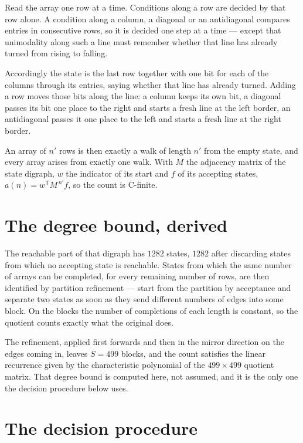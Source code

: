 \documentclass[11pt]{article}
\theoremstyle{definition}
\begin{document}
Read the array one row at a time. Conditions along a row are decided by that row alone. A condition along a column, a diagonal or an antidiagonal compares entries in consecutive rows, so it is decided one step at a time --- except that unimodality along such a line must remember whether that line has already turned from rising to falling.

Accordingly the state is the last row together with one bit for each of the columns through its entries, saying whether that line has already turned. Adding a row moves those bits along the line: a column keeps its own bit, a diagonal passes its bit one place to the right and starts a fresh line at the left border, an antidiagonal passes it one place to the left and starts a fresh line at the right border.

An array of $n'$ rows is then exactly a walk of length $n'$ from the empty state, and every array arises from exactly one walk. With $M$ the adjacency matrix of the state digraph, $w$ the indicator of its start and $f$ of its accepting states, $a(n) = w^{\mathsf T}M^{\,n'}f$, so the count is C-finite.

\section{The degree bound, derived}

The reachable part of that digraph has $1282$ states, $1282$ after discarding states from which no accepting state is reachable. States from which the same number of arrays can be completed, for every remaining number of rows, are then identified by partition refinement --- start from the partition by acceptance and separate two states as soon as they send different numbers of edges into some block. On the blocks the number of completions of each length is constant, so the quotient counts exactly what the original does.

The refinement, applied first forwards and then in the mirror direction on the edges coming in, leaves $S = 499$ blocks, and the count satisfies the linear recurrence given by the characteristic polynomial of the $499 \times 499$ quotient matrix. That degree bound is computed here, not assumed, and it is the only one the decision procedure below uses.

\section{The decision procedure}
\end{document}
